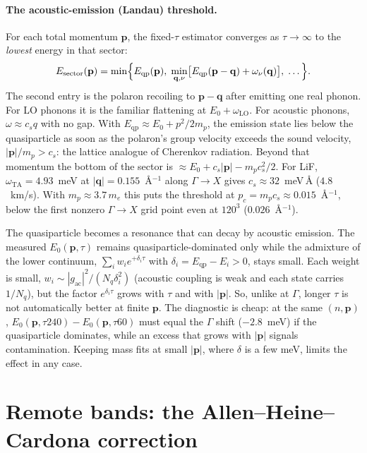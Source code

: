 \documentclass[11pt]{article}
\newcommand{\qv}{\mathbf{q}}
\begin{document}
\paragraph{The acoustic-emission (Landau) threshold.} For each total momentum $\mathbf p$, the fixed-$\tau$ estimator converges as $\tau\to\infty$ to the \emph{lowest} energy in that sector:
\begin{equation}
  E_{\mathrm{sector}}(\mathbf p)=\min\Bigl\{E_{\mathrm{qp}}(\mathbf p),\;\min_{\qv,\nu}\bigl[E_{\mathrm{qp}}(\mathbf p-\qv)+\omega_{\nu}(\qv)\bigr],\;\dots\Bigr\}.
\end{equation}
The second entry is the polaron recoiling to $\mathbf p-\qv$ after emitting one real phonon. For LO phonons it is the familiar flattening at $E_{0}+\omega_{\mathrm{LO}}$. For acoustic phonons, $\omega\approx c_{s}q$ with no gap. With $E_{\mathrm{qp}}\approx E_{0}+p^{2}/2m_{p}$, the emission state lies below the quasiparticle as soon as the polaron's group velocity exceeds the sound velocity, $|\mathbf p|/m_{p}>c_{s}$: the lattice analogue of Cherenkov radiation. Beyond that momentum the bottom of the sector is $\approx E_{0}+c_{s}|\mathbf p|-m_{p}c_{s}^{2}/2$. For LiF, $\omega_{\mathrm{TA}}=4.93$~meV at $|\qv|=0.155$~\AA$^{-1}$ along $\Gamma\to X$ gives $c_{s}\approx32$~meV\,\AA{} ($4.8$~km/s). With $m_{p}\approx3.7\,m_{e}$ this puts the threshold at $p_{c}=m_{p}c_{s}\approx0.015$~\AA$^{-1}$, below the first nonzero $\Gamma\to X$ grid point even at $120^{3}$ ($0.026$~\AA$^{-1}$).

The quasiparticle becomes a resonance that can decay by acoustic emission. The measured $E_{0}(\mathbf p,\tau)$ remains quasiparticle-dominated only while the admixture of the lower continuum, $\sum_{i}w_{i}e^{+\delta_{i}\tau}$ with $\delta_{i}=E_{\mathrm{qp}}-E_{i}>0$, stays small. Each weight is small, $w_{i}\sim|g_{\mathrm{ac}}|^{2}/(N_{q}\delta_{i}^{2})$ (acoustic coupling is weak and each state carries $1/N_{q}$), but the factor $e^{\delta_{i}\tau}$ grows with $\tau$ and with $|\mathbf p|$. So, unlike at $\Gamma$, longer $\tau$ is not automatically better at finite $\mathbf p$. The diagnostic is cheap: at the same $(n,\mathbf p)$, $E_{0}(\mathbf p,\tau240)-E_{0}(\mathbf p,\tau60)$ must equal the $\Gamma$ shift ($-2.8$~meV) if the quasiparticle dominates, while an excess that grows with $|\mathbf p|$ signals contamination. Keeping mass fits at small $|\mathbf p|$, where $\delta$ is a few meV, limits the effect in any case.

\section{Remote bands: the Allen--Heine--Cardona correction}
\label{sec:ahc}
\end{document}
